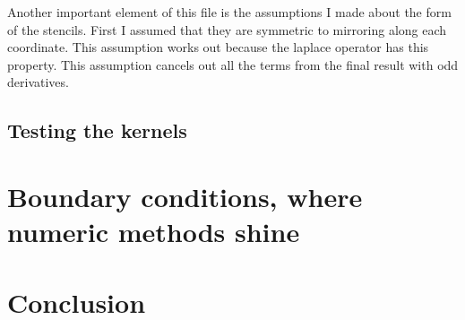 \documentclass[pdftex,12pt,a4paper]{article}
\begin{document}
		Another important element of this file is the assumptions I made about the form of the stencils. First I assumed that they are symmetric to mirroring along each coordinate. This assumption works out because the laplace operator has this property. This assumption cancels out all the terms from the final result with odd derivatives.
	\subsection{Testing the kernels}
		
	\section{Boundary conditions, where numeric methods shine}
		
	\section{Conclusion}
		
	
    
\end{document}
